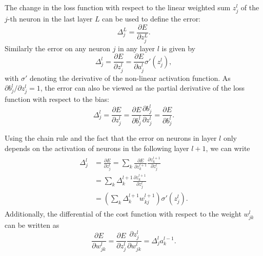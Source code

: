 The change in the loss function with respect to the linear weighted sum $z^{l}_{j}$ of the $j$-th
neuron in the last layer $L$ can be used to define the error:
\begin{equation} %
    \Delta^{L}_{j}=\frac{\partial E}{\partial z^{L}_{j}}.
\end{equation}
Similarly the error on any neuron $j$ in any layer $l$ is given by
\begin{equation} %
    \Delta^{l}_{j}=\frac{\partial E}{\partial z^{l}_{j}}=\frac{\partial E}{\partial a^{l}_{j}}
    \sigma '(z^{l}_{j}),
    \label{eq:backprop_1}
\end{equation}
with $\sigma '$ denoting the derivative of the non-linear activation function. As $\partial
    b^{l}_{j}/\partial z^{l}_{j}=1$, the error can also be viewed as the partial derivative of the
loss function with respect to the bias:
\begin{equation} %
    \Delta^{l}_{j}=\frac{\partial E}{\partial z^{l}_{j}}
    =\frac{\partial E}{\partial b^{l}_{j}}\frac{\partial b^{l}_{j}}{\partial z^{l}_{j}}
    =\frac{\partial E}{\partial b^{l}_{j}}.
    \label{eq:backprop_2}
\end{equation}

Using the chain rule and the fact that the error on neurons in layer $l$ only depends on the
activation of neurons in the following layer $l+1$, we can write
\begin{align} %
    \begin{split}
        \Delta^{l}_{j} &=\frac{\partial E}{\partial z^{l}_{j}}
        =\sum_{k}\frac{\partial E}{\partial z^{l+1}_{k}}
        \frac{\partial z^{l+1}_{k}}{\partial z^{l}_{j}} \\
        &=\sum_{k}\Delta^{l+1}_{k}\frac{\partial z^{l+1}_{k}}{\partial z^{l}_{j}} \\
        &=\left(\sum_{k}\Delta^{l+1}_{k}w^{l+1}_{kj}\right)\sigma '(z^{l}_{j}).
    \end{split}
    \label{eq:backprop_3}
\end{align}
Additionally, the differential of the cost function with respect to the weight $w^{l}_{jk}$ can be
written as
\begin{equation} %
    \frac{\partial E}{\partial w^{l}_{jk}}
    =\frac{\partial E}{\partial z^{l}_{j}}\frac{\partial z^{l}_{j}}{\partial w^{l}_{jk}}
    =\Delta^{l}_{j}a^{l-1}_{k}.
    \label{eq:backprop_4}
\end{equation}

